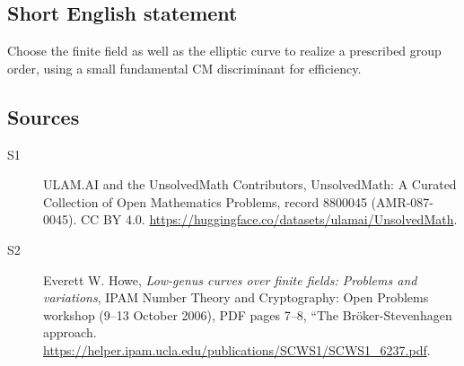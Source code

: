 \documentclass[11pt]{article}
\begin{document}
\subsection{Short English statement}
Choose the finite field as well as the elliptic curve to realize a prescribed group order, using a small fundamental CM discriminant for efficiency.
\subsection{Sources}
\begin{description}
\item[\hypertarget{source:8800045:1}{S1}] ULAM.AI and the UnsolvedMath Contributors, UnsolvedMath: A Curated Collection of Open Mathematics Problems, record 8800045 (AMR-087-0045). CC BY 4.0. \url{https://huggingface.co/datasets/ulamai/UnsolvedMath}.
\item[\hypertarget{source:8800045:2}{S2}] Everett W. Howe, \emph{Low-genus curves over finite fields: Problems and variations}, IPAM Number Theory and Cryptography: Open Problems workshop (9--13 October 2006), PDF pages 7--8, ``The Bröker-Stevenhagen approach. \url{https://helper.ipam.ucla.edu/publications/SCWS1/SCWS1_6237.pdf}.
\end{description}
\label{end:8800045}
\end{document}
